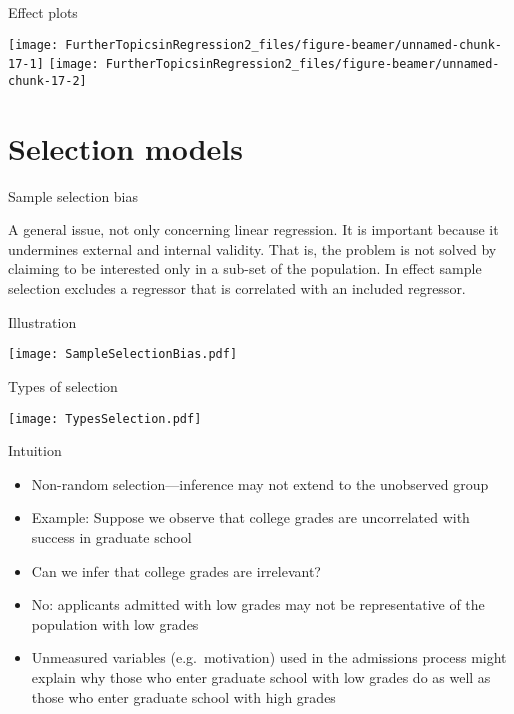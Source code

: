 \documentclass[10pt,ignorenonframetext,]{beamer}
\providecommand{\tightlist}{%
  \setlength{\itemsep}{0pt}\setlength{\parskip}{0pt}}
\begin{document}
\begin{frame}{Effect plots}

\texttt{[image: FurtherTopicsinRegression2\_files/figure-beamer/unnamed-chunk-17-1]}
\texttt{[image: FurtherTopicsinRegression2\_files/figure-beamer/unnamed-chunk-17-2]}

\end{frame}

\section{Selection models}\label{selection-models}

\begin{frame}{Sample selection bias}

A general issue, not only concerning linear regression. It is important
because it undermines external and internal validity. That is, the
problem is not solved by claiming to be interested only in a sub-set of
the population. In effect sample selection excludes a regressor that is
correlated with an included regressor.

\end{frame}

\begin{frame}{Illustration}

\texttt{[image: SampleSelectionBias.pdf]}

\end{frame}

\begin{frame}{Types of selection}

\texttt{[image: TypesSelection.pdf]}

\end{frame}

\begin{frame}{Intuition}

\begin{itemize}
\tightlist
\item
  Non-random selection---inference may not extend to the unobserved
  group
\item
  Example: Suppose we observe that college grades are uncorrelated with
  success in graduate school
\item
  Can we infer that college grades are irrelevant?
\item
  No: applicants admitted with low grades may not be representative of
  the population with low grades
\item
  Unmeasured variables (e.g.~motivation) used in the admissions process
  might explain why those who enter graduate school with low grades do
  as well as those who enter graduate school with high grades
\end{itemize}

\end{frame}
\end{document}
